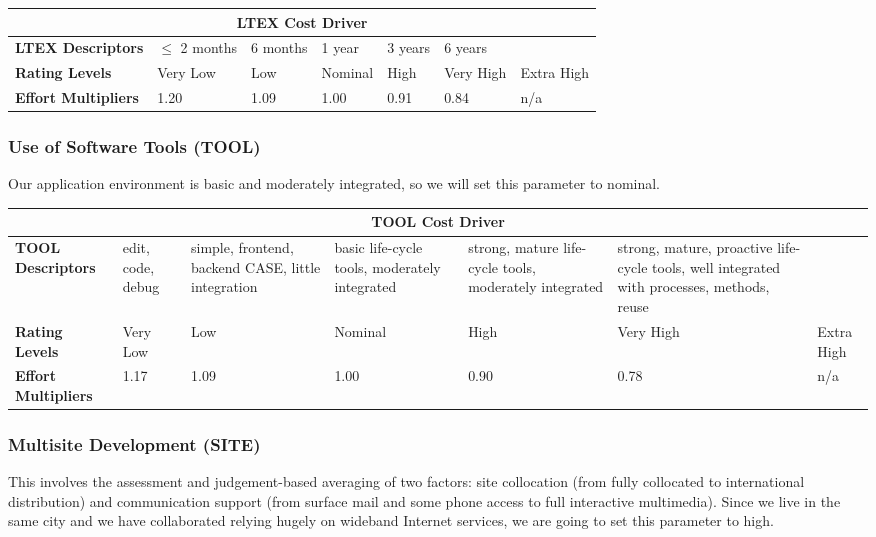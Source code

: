 \begin{table}[H]
	\centering
	\begin{tabular}{| m{1.8cm} | m{2.2cm} | m{1.7cm} | m{1.5cm} | m{1.3cm} | m{1.3cm} | m{0.9cm} | }
		\hline
		\multicolumn{7}{|c|}{ \textbf{LTEX Cost Driver} } \\
		\hline
		\hline
		\textbf{LTEX Descriptors} & \(\leq\) 2 months & 6 months & 1 year & 3 years & 6 years & \\
		\hline
		\textbf{Rating Levels} & Very Low & Low & Nominal & High & Very High & Extra High \\
		\hline
		\textbf{Effort Multipliers} & 1.20 & 1.09 & 1.00 & 0.91 & 0.84 & n/a \\ 
		\hline
	\end{tabular}
\end{table}

\subsubsection*{Use of Software Tools (TOOL)}
Our application environment is basic and moderately integrated, so we will set this parameter to nominal.

\begin{table}[H]
	\centering
	\begin{tabular}{| m{1.8cm} | m{1.1cm} | m{1.7cm} | m{1.6cm} | m{1.6cm} | m{2cm} | m{0.9cm} | }
		\hline
		\multicolumn{7}{|c|}{ \textbf{TOOL Cost Driver} } \\
		\hline
		\hline
		\textbf{TOOL Descriptors} & edit, code, debug & simple, frontend, backend CASE, little integration & basic life-cycle tools, moderately integrated & strong, mature life-cycle tools, moderately integrated & strong, mature, proactive life-cycle tools, well integrated with processes, methods, reuse &  \\
		\hline
		\textbf{Rating Levels} & Very Low & Low & Nominal & High & Very High & Extra High \\
		\hline
		\textbf{Effort Multipliers} & 1.17 & 1.09 & 1.00 & 0.90 & 0.78 & n/a \\ 
		\hline
	\end{tabular}
\end{table}

\subsubsection*{Multisite Development (SITE)}
This involves the assessment and judgement-based averaging of two factors: site collocation (from fully collocated to international distribution) and communication support (from surface mail and some phone access to full interactive multimedia). Since we live in the same city and we have collaborated relying hugely on wideband Internet services, we are going to set this parameter to high.


